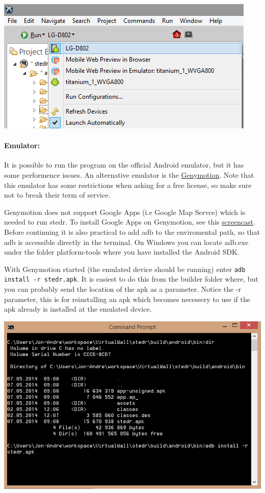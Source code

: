 \begin{center}
\includegraphics[scale=0.45]{guide/f4.png} 
\end{center}

\paragraph{Emulator:}
It is possible to run the program on the official Android emulator, but it has some performence issues. An alternative emulator is the \href{https://shop.genymotion.com/index.php?controller=order-opc}{Genymotion}. Note that this emulator has some restrictions when asking for a free license, so make sure not to break their term of service. 

Genymotion does not support Google Apps (i.e Google Map Servce) which is needed to run stedr. To install Google Apps on Genymotion, see this \href{https://www.youtube.com/watch?v=iCRNqCXGNK0}{screencast}. Before continuing it is also practical to add adb to the enviromental path, so that adb is accessible directly in the terminal. On Windows you can locate adb.exe under the folder platform-tools where you have installed the Android SDK. 

With Genymotion started (the emulated device should be running) enter \texttt{adb install -r stedr.apk}. It is easiest to do this from the builder folder where, but you can probably send the location of the apk as a parameter. Notice the -r parameter, this is for reinstalling an apk which becomes necessery to use if the apk already is installed at the emulated device.

\begin{center}
\includegraphics[scale=0.7]{guide/f45.png} 
\end{center}

